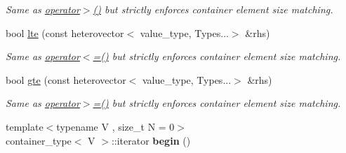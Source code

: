 \begin{DoxyCompactItemize}
\begin{DoxyCompactList}\small\item\em Same as \hyperlink{classheterogeneous_1_1heterovector_3_01_t_00_01_u_00_01_types_8_8_8_4_a8a69caabdf8c6bf8dc6c34de2716b200}{operator$>$()} but strictly enforces container element size matching. \end{DoxyCompactList}\item 
\hypertarget{classheterogeneous_1_1heterovector_3_01_t_00_01_u_00_01_types_8_8_8_4_a7f2c0fbec7fe54b57591604c400cdb9a}{}bool \hyperlink{classheterogeneous_1_1heterovector_3_01_t_00_01_u_00_01_types_8_8_8_4_a7f2c0fbec7fe54b57591604c400cdb9a}{lte} (const heterovector$<$ value\+\_\+type, Types...$>$ \&rhs)\label{classheterogeneous_1_1heterovector_3_01_t_00_01_u_00_01_types_8_8_8_4_a7f2c0fbec7fe54b57591604c400cdb9a}

\begin{DoxyCompactList}\small\item\em Same as \hyperlink{classheterogeneous_1_1heterovector_3_01_t_00_01_u_00_01_types_8_8_8_4_af7976b8320749a3bc7e9c4da57524870}{operator$<$=()} but strictly enforces container element size matching. \end{DoxyCompactList}\item 
\hypertarget{classheterogeneous_1_1heterovector_3_01_t_00_01_u_00_01_types_8_8_8_4_ab1d3b160f73b32347a291575f1b979a5}{}bool \hyperlink{classheterogeneous_1_1heterovector_3_01_t_00_01_u_00_01_types_8_8_8_4_ab1d3b160f73b32347a291575f1b979a5}{gte} (const heterovector$<$ value\+\_\+type, Types...$>$ \&rhs)\label{classheterogeneous_1_1heterovector_3_01_t_00_01_u_00_01_types_8_8_8_4_ab1d3b160f73b32347a291575f1b979a5}

\begin{DoxyCompactList}\small\item\em Same as \hyperlink{classheterogeneous_1_1heterovector_3_01_t_00_01_u_00_01_types_8_8_8_4_a7860943d8c08be5fc5e187781f1f9282}{operator$>$=()} but strictly enforces container element size matching. \end{DoxyCompactList}\item 
\hypertarget{classheterogeneous_1_1heterovector_3_01_t_00_01_u_00_01_types_8_8_8_4_a6b45badc1b6d7541c9ac027393de376c}{}{\footnotesize template$<$typename V , size\+\_\+t N = 0$>$ }\\container\+\_\+type$<$ V $>$\+::iterator {\bfseries begin} ()\label{classheterogeneous_1_1heterovector_3_01_t_00_01_u_00_01_types_8_8_8_4_a6b45badc1b6d7541c9ac027393de376c}


\end{DoxyCompactItemize}
